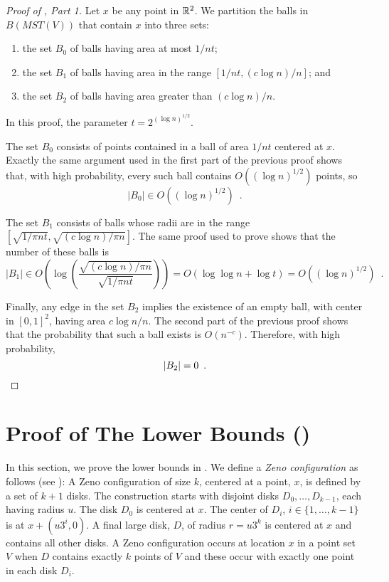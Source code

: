 \documentclass{patmorin}
\newcommand{\mst}{\mathit{MST}}
\begin{document}
\begin{proof}[Proof of , Part 1]
Let $x$ be any point in $\mathbb{R}^2$.  We partition the balls in $B(\mst(V))$
that contain $x$ into three sets:
\begin{enumerate}
  \item the set $B_0$ of balls having area at most $1/nt$;
  \item the set $B_1$ of balls having area in the range $[1/nt,(c\log
  n)/n]$; and
  \item the set $B_2$ of balls having area greater than $(c\log n)/n$.
\end{enumerate}
In this proof, the parameter $t=2^{(\log n)^{1/2}}$.

The set $B_0$ consists of points contained in a ball of area $1/nt$
centered at $x$.  Exactly the same argument used in the first part of
the previous proof shows that, with high probability, every such ball contains
$O((\log n)^{1/2})$ points, so
\[
     |B_0| \in O((\log n)^{1/2}) \enspace .
\]

The set $B_1$ consists of balls whose radii are in the range $[\sqrt{1/\pi
nt},\sqrt{(c\log n)/\pi n}]$.  The same proof used to prove 
shows that the number of these balls is
\[
    |B_1| \in O\left(\log\left(\frac{\sqrt{(c\log n)/\pi n}}{\sqrt{1/\pi nt}}\right)\right) = O(\log\log n + \log t) = O((\log n)^{1/2}) \enspace .
\]

Finally, any edge in the set $B_2$ implies the existence of an empty ball,
with center in $[0,1]^2$, having area $c\log n/n$.  The second part of the
previous proof shows that the probability that such a ball exists is
$O(n^{-c})$.  Therefore, with high probability,
\[
   |B_2| = 0 \enspace . \qedhere
\]
\end{proof}

\section{Proof of The Lower Bounds ()}

In this section, we prove the lower bounds in .
We define a \emph{Zeno configuration} as follows (see ):
A Zeno configuration of size $k$, centered at a point, $x$, is defined
by a set of $k+1$ disks.  The construction starts with disjoint disks
$D_0,\ldots,D_{k-1}$, each having radius $u$.  The disk $D_0$ is centered
at $x$.  The center of $D_i$, $i\in\{1,\ldots,k-1\}$ is at $x+(u3^i, 0)$.
A final large disk, $D$, of radius $r=u3^k$ is centered at $x$ and
contains all other disks.  A Zeno configuration occurs at location $x$
in a point set $V$ when $D$ contains exactly $k$ points of $V$ and these
occur with exactly one point in each disk $D_i$.
\end{document}
